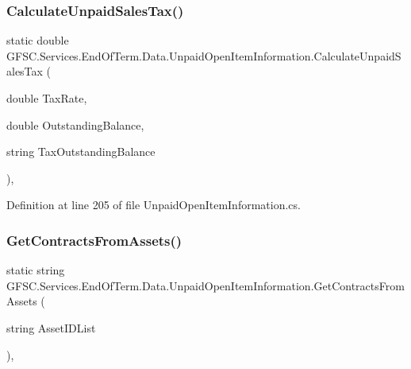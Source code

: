 \subsubsection{\texorpdfstring{Calculate\+Unpaid\+Sales\+Tax()}{CalculateUnpaidSalesTax()}\hspace{0.1cm}{\footnotesize\ttfamily [2/2]}}
{\footnotesize\ttfamily static double G\+F\+S\+C.\+Services.\+End\+Of\+Term.\+Data.\+Unpaid\+Open\+Item\+Information.\+Calculate\+Unpaid\+Sales\+Tax (\begin{DoxyParamCaption}\item[{double}]{Tax\+Rate,  }\item[{double}]{Outstanding\+Balance,  }\item[{string}]{Tax\+Outstanding\+Balance }\end{DoxyParamCaption})\hspace{0.3cm}{\ttfamily [static]}, {\ttfamily [private]}}



Definition at line 205 of file Unpaid\+Open\+Item\+Information.\+cs.

\mbox{\label{class_g_f_s_c_1_1_services_1_1_end_of_term_1_1_data_1_1_unpaid_open_item_information_a6bcc624028be7618f55368db0d27ed5a}} 
\subsubsection{\texorpdfstring{Get\+Contracts\+From\+Assets()}{GetContractsFromAssets()}}
{\footnotesize\ttfamily static string G\+F\+S\+C.\+Services.\+End\+Of\+Term.\+Data.\+Unpaid\+Open\+Item\+Information.\+Get\+Contracts\+From\+Assets (\begin{DoxyParamCaption}\item[{string}]{Asset\+I\+D\+List }\end{DoxyParamCaption})\hspace{0.3cm}{\ttfamily [static]}, {\ttfamily [package]}}



